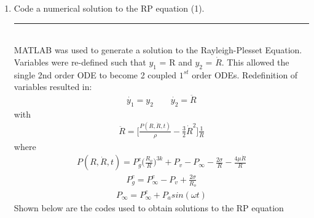 \documentclass[12pt]{article}
\begin{document}
\begin{enumerate}

\item Code a numerical solution to the RP equation (1).\\
\noindent\rule{14cm}{0.4pt}\\
MATLAB was used to generate a solution to the Rayleigh-Plesset Equation. Variables were re-defined such that $y_1$ = R and $y_2$ = $\dot{R}$. This allowed the single 2nd order ODE to become 2 coupled $1^{st}$ order ODEs. Redefinition of variables resulted in:
\begin{align*}
\dot{y_1} = y_2  \qquad \dot{y_2} = \ddot{R}
\end{align*}
with
\begin{align*}
\ddot{R} = \Bigg[\frac{P(R,\dot{R},t)}{\rho} - \frac{3}{2}\dot{R}^2\Bigg]\frac{1}{R}
\end{align*}
where
\begin{align*}
P(R,\dot{R},t) = P_g^e\Bigg(\frac{R_o}{R}\Bigg)^{3k} + P_v - P_{\infty} - \frac{2\sigma}{R} - \frac{4\mu\dot{R}}{R}
\end{align*}
\begin{align*}
P_g^e = P_{\infty}^e - P_v + \frac{2\sigma}{R_o}
\end{align*}
\begin{align*}
P_\infty = P_\infty^e + P_a sin(\omega t)
\end{align*}
Shown below are the codes used to obtain solutions to the RP equation




\end{enumerate}
\end{document}
